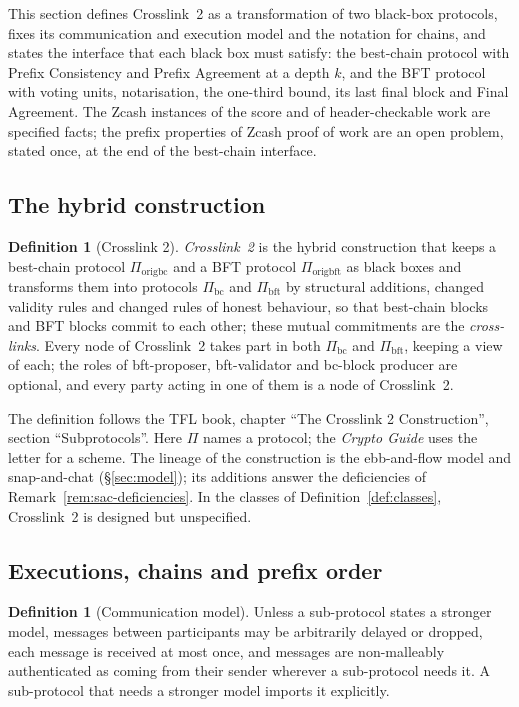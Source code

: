 \documentclass[11pt,a4paper]{article}
\theoremstyle{definition}
\newtheorem{definition}[theorem]{Definition}
\newcommand{\bc}{\mathrm{bc}}
\newcommand{\bft}{\mathrm{bft}}
\newcommand{\Piorigbc}{\Pi_{\mathrm{origbc}}}
\newcommand{\Piorigbft}{\Pi_{\mathrm{origbft}}}
\newcommand{\Pibc}{\Pi_{\bc}}
\newcommand{\Pibft}{\Pi_{\bft}}
\begin{document}
This section defines Crosslink~2 as a transformation of two black-box
protocols, fixes its communication and execution model and the notation for
chains, and states the interface that each black box must satisfy: the
best-chain protocol with Prefix Consistency and Prefix Agreement at a depth
$k$, and the BFT protocol with voting units, notarisation, the one-third
bound, its last final block and Final Agreement. The Zcash instances of the
score and of header-checkable work are specified facts; the prefix properties
of Zcash proof of work are an open problem, stated once, at the end of the
best-chain interface.

\subsection{The hybrid construction}\label{sec:iface-hybrid}

\begin{definition}[Crosslink 2]\label{def:crosslink}
\emph{Crosslink~2} is the hybrid construction that keeps a best-chain
protocol $\Piorigbc$ and a BFT protocol $\Piorigbft$ as black boxes and
transforms them into protocols $\Pibc$ and $\Pibft$ by structural additions,
changed validity rules and changed rules of honest behaviour, so that
best-chain blocks and BFT blocks commit to each other; these mutual
commitments are the \emph{cross-links}. Every node of Crosslink~2 takes part
in both $\Pibc$ and $\Pibft$, keeping a view of each; the roles of
bft-proposer, bft-validator and bc-block producer are optional, and every
party acting in one of them is a node of Crosslink~2.
\end{definition}

The definition follows the TFL book, chapter ``The Crosslink 2
Construction'', section ``Subprotocols''. Here $\Pi$ names a protocol; the
\emph{Crypto Guide} uses the letter for a scheme. The lineage of the
construction is the ebb-and-flow model and snap-and-chat
(\S\ref{sec:model}); its additions answer the deficiencies of
Remark~\ref{rem:sac-deficiencies}. In the classes of
Definition~\ref{def:classes}, Crosslink~2 is designed but unspecified.

\subsection{Executions, chains and prefix order}\label{sec:iface-chains}

\begin{definition}[Communication model]\label{def:comm}
Unless a sub-protocol states a stronger model, messages between participants
may be arbitrarily delayed or dropped, each message is received at most
once, and messages are non-malleably authenticated as coming from their
sender wherever a sub-protocol needs it. A sub-protocol that needs a
stronger model imports it explicitly.
\end{definition}
\end{document}
